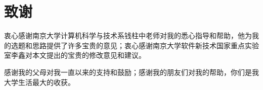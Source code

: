 \chapter*{致\qquad 谢}

衷心感谢南京大学计算机科学与技术系钱柱中老师对我的悉心指导和帮助，他为我的选题和思路提供了许多宝贵的意见；衷心感谢南京大学软件新技术国家重点实验室李鑫对本文提出的宝贵的修改意见和建议。

感谢我的父母对我一直以来的支持和鼓励；感谢我的朋友们对我的帮助，你们是我大学生活最大的收获。
